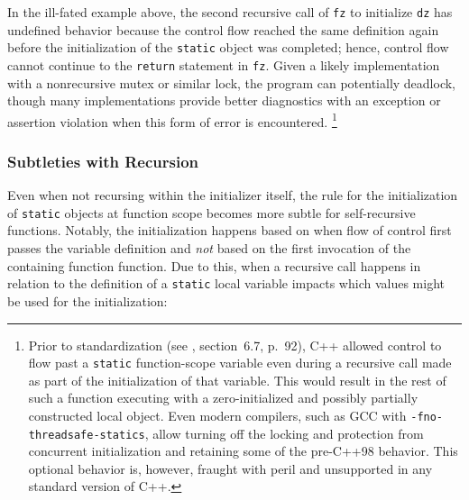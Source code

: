\noindent In the ill-fated example above, the second recursive call of \lstinline!fz!
to initialize \lstinline!dz! has undefined behavior because the control flow reached the
same definition again before the initialization of the
\lstinline!static! object was completed; hence, control flow cannot continue to the
\lstinline!return! statement in \lstinline!fz!. Given a likely implementation
with a nonrecursive mutex or similar lock, the program can potentially deadlock,
though many implementations provide better diagnostics with an exception or
assertion violation when this form of error is encountered.
{\cprotect\footnote{Prior to standardization (see \cite{ellis90}, section~6.7, p.~92),
C++ allowed control to flow past a
\lstinline!static! function-scope variable even during a recursive call
made as part of the initialization of that variable. This would result
in the rest of such a function executing with a zero-initialized and
possibly partially constructed local object. Even modern compilers,
such as GCC with \lstinline!-fno-threadsafe-statics!, allow turning off
the locking and protection from concurrent initialization and
retaining some of the pre-C++98 behavior. This optional behavior is,
however, fraught with peril and unsupported in any standard version of
  C++.}}


\subsubsection[Subtleties with Recursion]{Subtleties with Recursion}\label{subtleties-with-recursion}

Even when not recursing within the initializer itself, the rule for the
initialization of \lstinline!static! objects at function
scope becomes more subtle for self-recursive functions.
Notably, the initialization happens based
on when flow of control first passes the variable definition and \emph{not}
based on the first invocation of the containing function function.  Due to this, when a recursive call
happens in relation to the definition of a \lstinline!static! local variable
impacts which values might be used for the initialization:

